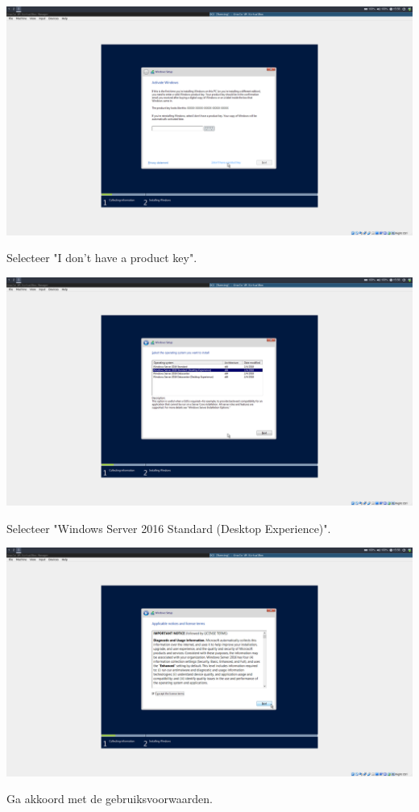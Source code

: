 \documentclass[a4paper]{article}
\begin{document}
\begin{center}
	\includegraphics[width=15cm]{Pictures/Windows_Install/1542293899.png}
	
	Selecteer "I don't have a product key".
\end{center}
\begin{center}
	\includegraphics[width=15cm]{Pictures/Windows_Install/1542293908.png}
	
	Selecteer "Windows Server 2016 Standard (Desktop Experience)".
\end{center}
\begin{center}
	\includegraphics[width=15cm]{Pictures/Windows_Install/1542293921.png}
	
	Ga akkoord met de gebruiksvoorwaarden.
\end{center}
\end{document}
